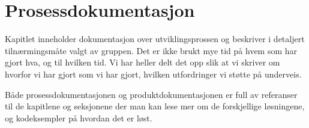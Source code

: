 \chapter{Prosessdokumentasjon}
Kapitlet inneholder dokumentasjon over utviklingsprossen og beskriver i detaljert tilnærmingsmåte valgt av gruppen.
Det er ikke brukt mye tid på hvem som har gjort hva, og til hvilken tid. Vi har heller delt det opp slik at vi skriver om hvorfor vi har gjort som vi har gjort, hvilken utfordringer vi støtte på underveis. 

Både prosessdokumentasjonen og produktdokumentasjonen er full av referanser til de kapitlene og seksjonene der man kan lese mer om de forskjellige løsningene, og kodeksempler på hvordan det er løst.





